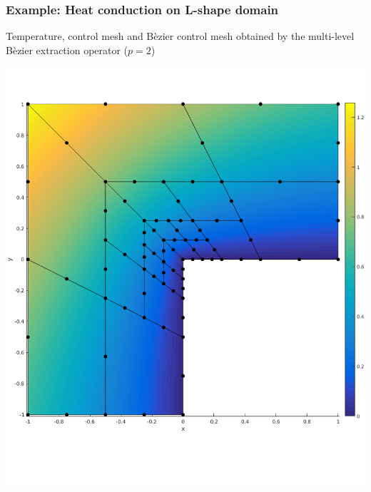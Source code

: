 \documentclass{beamer}
\begin{document}
\begin{frame}
	\frametitle{Example: Heat conduction on L-shape domain}%
	Temperature, control mesh and B\`ezier control mesh obtained by the multi-level B\`ezier extraction operator ($ p=2 $)\\
	\centering
	\begin{minipage}{0.49\textwidth}
		\centering
		\includegraphics[scale=0.24]{pics/lshape/lshape_beziernet_3.png}
	\end{minipage}
	\begin{minipage}{0.49\textwidth}
		\centering

\end{minipage}
\end{frame}
\end{document}
